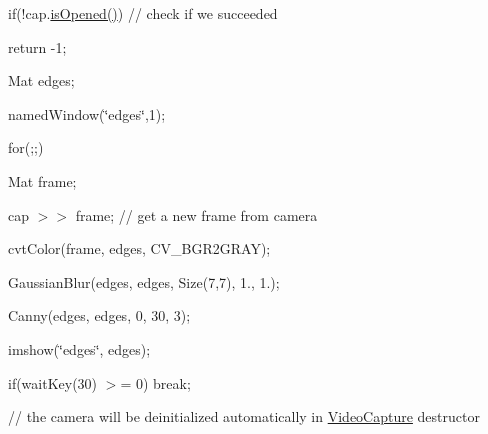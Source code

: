 {\ttfamily }

{\ttfamily if(!cap.\mbox{\hyperlink{classorg_1_1opencv_1_1highgui_1_1_video_capture_a9bb9204765ebe45c6958adad5aaa1319}{is\+Opened()}}) // check if we succeeded}

{\ttfamily }

{\ttfamily }

{\ttfamily return -\/1;}

{\ttfamily }

{\ttfamily }

{\ttfamily Mat edges;}

{\ttfamily }

{\ttfamily }

{\ttfamily named\+Window(\char`\"{}edges\char`\"{},1);}

{\ttfamily }

{\ttfamily }

{\ttfamily for(;;)}

{\ttfamily }

{\ttfamily }

{\ttfamily Mat frame;}

{\ttfamily }

{\ttfamily }

{\ttfamily cap $>$$>$ frame; // get a new frame from camera}

{\ttfamily }

{\ttfamily }

{\ttfamily cvt\+Color(frame, edges, C\+V\+\_\+\+B\+G\+R2\+G\+R\+A\+Y);}

{\ttfamily }

{\ttfamily }

{\ttfamily Gaussian\+Blur(edges, edges, Size(7,7), 1., 1.);}

{\ttfamily }

{\ttfamily }

{\ttfamily Canny(edges, edges, 0, 30, 3);}

{\ttfamily }

{\ttfamily }

{\ttfamily imshow(\char`\"{}edges\char`\"{}, edges);}

{\ttfamily }

{\ttfamily }

{\ttfamily if(wait\+Key(30) $>$= 0) break;}

{\ttfamily }

{\ttfamily }

{\ttfamily // the camera will be deinitialized automatically in \mbox{\hyperlink{classorg_1_1opencv_1_1highgui_1_1_video_capture}{Video\+Capture}} destructor}

